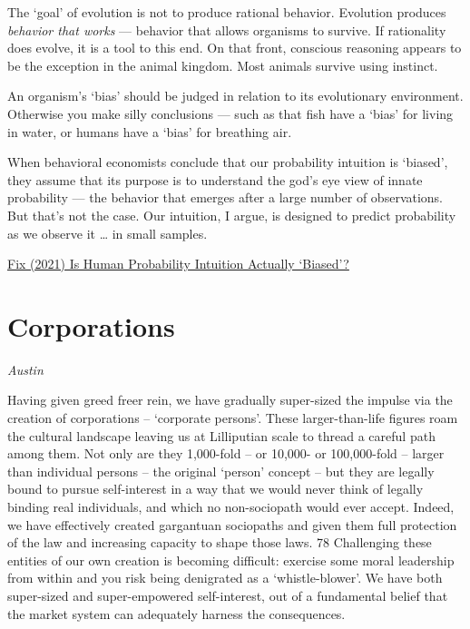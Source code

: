 \documentclass[
]{book}
\begin{document}
The `goal' of evolution is not to produce rational behavior. Evolution produces \emph{behavior that works} --- behavior that allows organisms to survive. If rationality does evolve, it is a tool to this end. On that front, conscious reasoning appears to be the exception in the animal kingdom. Most animals survive using instinct.

An organism's `bias' should be judged in relation to its evolutionary environment. Otherwise you make silly conclusions --- such as that fish have a `bias' for living in water, or humans have a `bias' for breathing air.

When behavioral economists conclude that our probability intuition is `biased', they assume that its purpose is to understand the god's eye view of innate probability --- the behavior that emerges after a large number of observations. But that's not the case. Our intuition, I argue, is designed to predict probability as we observe it \ldots{} in small samples.

\href{https://economicsfromthetopdown.com/2021/07/09/is-human-probability-intuition-actually-biased/}{Fix (2021) Is Human Probability Intuition Actually `Biased'?}

\hypertarget{corporations}{%
\chapter{Corporations}\label{corporations}}

\emph{Austin}

Having given greed freer rein, we have gradually super-sized the impulse via the creation of
corporations -- `corporate persons'. These larger-than-life figures roam the cultural landscape
leaving us at Lilliputian scale to thread a careful path among them. Not only are they 1,000-fold -- or
10,000- or 100,000-fold -- larger than individual persons -- the original `person' concept -- but they
are legally bound to pursue self-interest in a way that we would never think of legally binding real
individuals, and which no non-sociopath would ever accept. Indeed, we have effectively created
gargantuan sociopaths and given them full protection of the law and increasing capacity to shape
those laws. 78 Challenging these entities of our own creation is becoming difficult: exercise some
moral leadership from within and you risk being denigrated as a `whistle-blower'. We have both
super-sized and super-empowered self-interest, out of a fundamental belief that the market system
can adequately harness the consequences.
\end{document}
